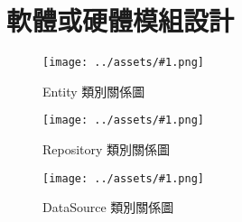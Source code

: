 \section{軟體或硬體模組設計}

\newcommand{\customfig}[2]{
  \begin{figure}[H]
    \centering
    \texttt{[image: ../assets/\#1.png]}
    \caption{#2}
    \label{#2}
  \end{figure}
}

\customfig{UML-Entity}{Entity 類別關係圖}
\customfig{UML-Repository}{Repository 類別關係圖}
\customfig{UML-DataSource}{DataSource 類別關係圖}
